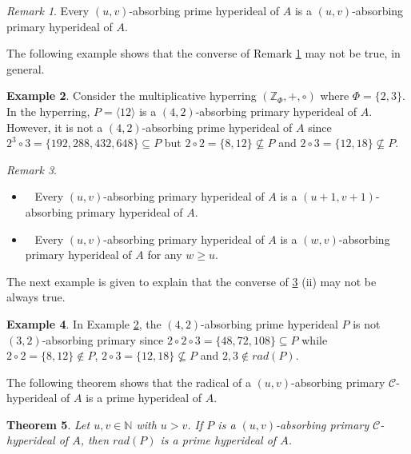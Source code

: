 \documentclass[preprint,review,10pt]{amsart}
\newtheorem{theorem}{Theorem}[section]
\theoremstyle{definition}
\newtheorem{example}[theorem]{Example}
\theoremstyle{remark}
\newtheorem{remark}[theorem]{Remark}
\numberwithin{equation}{section}
\begin{document}
\begin{remark} \label{r1}
Every $(u,v)$-absorbing prime  hyperideal of $A$ is a $(u,v)$-absorbing primary hyperideal of $A$. 
\end{remark}
The following example shows that the converse of Remark \ref{r1} may not be
true, in general.
\begin{example} \label{er1}
Consider the multiplicative hyperring $(\mathbb{Z}_{\Phi},+,\circ)$ where $\Phi=\{2,3\}$. In the hyperring, $P=\langle 12 \rangle$ is a $(4,2)$-absorbing primary hyperideal of $A$. However, it is not a $(4,2)$-absorbing prime hyperideal of $A$ since $2^3 \circ 3=\{192,288,432,648\} \subseteq P$ but $2 \circ 2=\{8,12\} \nsubseteq P$ and $2 \circ 3=\{12,18\} \nsubseteq P$.
\end{example}
\begin{remark} \label{r2}
\begin{itemize}
\item[\rm{(i)}]~ Every $(u,v)$-absorbing primary  hyperideal of $A$ is a $(u+1,v+1)$-absorbing primary hyperideal of $A$. 

\item[\rm{(ii)}]~ Every $(u,v)$-absorbing primary  hyperideal of $A$ is a $(w,v)$-absorbing primary hyperideal of $A$ for any $w \geq u$. 
\end{itemize}
\end{remark}
The next example is given to explain that the converse of \ref{r2} (ii) may not be always true.
\begin{example} \label{er2}
In Example \ref{er1}, the $(4,2)$-absorbing prime hyperideal $P$ is not $(3,2)$-absorbing primary since $2 \circ 2 \circ 3=\{48,72,108\} \subseteq P$ while $2 \circ 2=\{8,12\} \notin P$, $2 \circ 3=\{12,18\} \nsubseteq P$ and $2,3 \notin rad(P)$.
\end{example}
The following theorem shows that the radical of a $(u,v)$-absorbing primary $\mathcal{C}$-hyperideal of $A$ is a prime hyperideal of $A$.
\begin{theorem} \label{1}
Let $u,v \in \mathbb{N}$ with $u >v$. If $P$ is a $(u,v)$-absorbing primary $\mathcal{C}$-hyperideal of $A$, then $rad(P)$ is a prime hyperideal of $A$.
\end{theorem}
\end{document}

